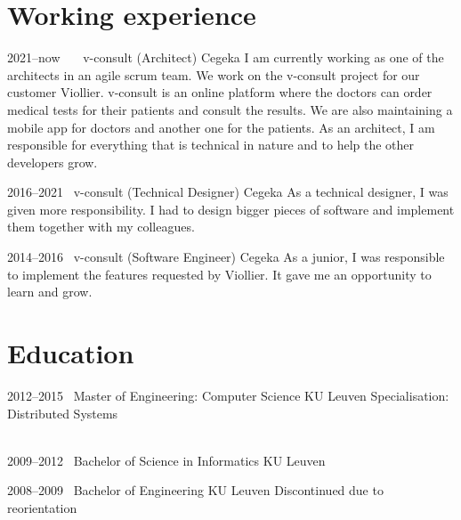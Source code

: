 \documentclass[a4paper]{friggeri-cv} %
\begin{document}
\section{Working experience}
\begin{entrylist}
\entry
{2021--now~~~} %
{v-consult (Architect)}
{Cegeka}
{I am currently working as one of the architects in an agile scrum team. We work on the v-consult project for our customer Viollier.
v-consult is an online platform where the doctors can order medical tests for their patients and consult the results.
We are also maintaining a mobile app for doctors and another one for the patients.
As an architect, I am responsible for everything that is technical in nature and to help the other developers grow.}


\entry
{2016--2021~} %
{v-consult (Technical Designer)}
{Cegeka}
{As a technical designer, I was given more responsibility. I had to design bigger pieces of software and implement them together with my colleagues.}


\entry
{2014--2016~} %
{v-consult (Software Engineer)}
{Cegeka}
{As a junior, I was responsible to implement the features requested by Viollier. It gave me an opportunity to learn and grow.}


\end{entrylist}

\section{Education}

\begin{entrylist}
\entry
{2012--2015~}
{Master of Engineering: Computer Science}
{KU Leuven}
{Specialisation: Distributed Systems\\
~}


\entry
{2009--2012~}
{Bachelor of Science in Informatics}
{KU Leuven}
{~}

\entry
{2008--2009~}
{Bachelor of Engineering}
{KU Leuven}
{Discontinued due to reorientation}
\end{entrylist}


\end{document}
